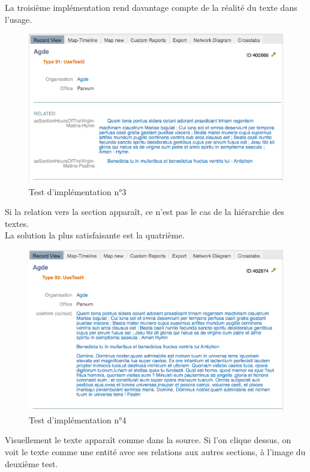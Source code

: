 \documentclass[a4paper,12pt,twoside]{book}
\begin{document}
La troisième implémentation rend davantage compte de la réalité du texte dans l’usage. 

    \begin{figure}[!h]
    \centering
    \includegraphics[width=15cm]{img/Modelisation/Tests_Implementation/UseTest3.png}
    \caption{Test d'implémentation n°3}
    \end{figure}

Si la relation vers la section apparaît, ce n'est pas le cas de la hiérarchie des textes.\\

La solution la plus satisfaisante est la quatrième.

    \begin{figure}[!h]
    \centering
    \includegraphics[width=15cm]{img/Modelisation/Tests_Implementation/UseTest4.png}
    \caption{Test d'implémentation n°4}
    \end{figure}
    
    Visuellement le texte apparaît comme dans la source. Si l’on clique dessus, on voit le texte comme une entité avec ses relations aux autres sections, à l'image du deuxième test.
\end{document}
